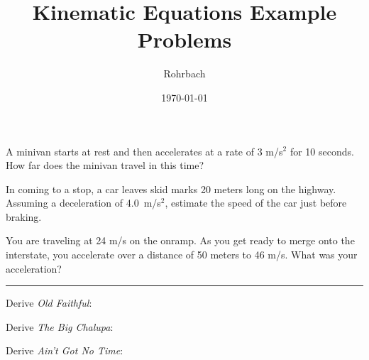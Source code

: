 \documentclass[10pt]{exam}
\title{Kinematic Equations Example Problems}
\author{Rohrbach}
\date{\today}
\begin{document}
\maketitle


\begin{questions}
    
\question
  A minivan starts at rest and then accelerates at a rate of 3 m/s$^2$ for 10 seconds.  How far does the minivan travel in this time?
  \vs 

\question
  In coming to a stop, a car leaves skid marks 20 meters long on the highway.  Assuming a deceleration of 4.0~m/s$^2$, estimate the speed of the car just before braking. 
  \vs 

\pagebreak

\question
  You are traveling at 24 m/s on the onramp.  As you get ready to merge onto the interstate, you accelerate over a distance of 50 meters to 46 m/s.  What was your acceleration?
  \vs[2]


\hrule

\question
  Derive \emph{Old Faithful}:
  \vs[1]

\question
  Derive \emph{The Big Chalupa}:
  \vs[3]

\question
  Derive \emph{Ain't Got No Time}:
  \vs


\end{questions}
\end{document}
